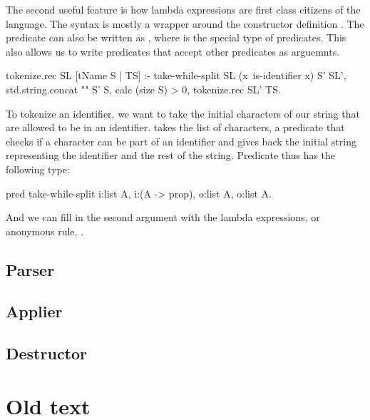 \documentclass[thesis.tex]{subfiles}
\begin{document}
{{The second useful feature is how lambda expressions are first class citizens of the language. The  syntax is mostly a wrapper around the constructor definition . The predicate  can also be written as , where  is the special type of predicates. This also allows us to write predicates that accept other predicates as arguemnts.
\begin{elpicode}
  tokenize.rec SL [tName S | TS] :-
    take-while-split SL (x\ is-identifier x) S' SL',
    std.string.concat "" S' S,
    { calc (size S) } > 0,
    tokenize.rec SL' TS.
\end{elpicode}
To tokenize an identifier, we want to take the initial characters of our string that are allowed to be in an identifier.  takes the list of characters, a predicate that checks if a character can be part of an identifier and gives back the initial string representing the identifier and the rest of the string. Predicate  thus has the following type:
\begin{elpicode}
  pred take-while-split i:list A, i:(A -> prop), o:list A, o:list A.
\end{elpicode}
And we can fill in the second argument with the lambda expressions, or anonymous rule, .



\subsection{Parser}


\subsection{Applier}\label{ss:applier}

\subsection{Destructor}

\section{Old text}

}}
\end{document}
